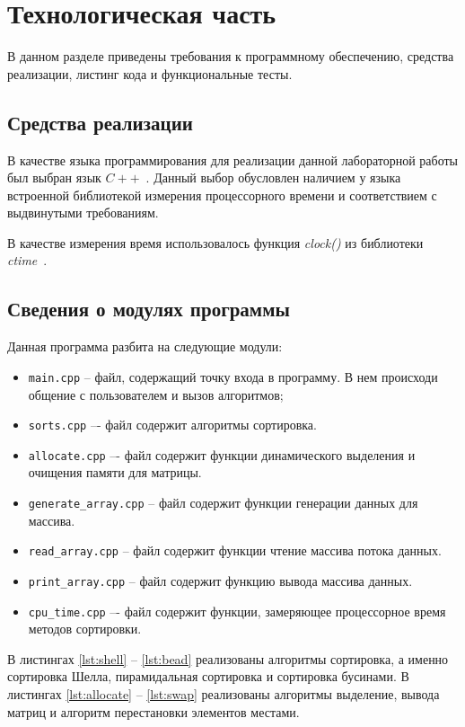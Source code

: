 \chapter{Технологическая часть}

В данном разделе приведены требования к программному обеспечению, средства реализации, листинг кода и функциональные тесты.

\section{Средства реализации}

В качестве языка программирования для реализации данной лабораторной работы был выбран язык $C++$~\cite{cpp-lang}. Данный выбор обусловлен наличием у языка
встроенной библиотекой измерения процессорного времени и соответствием с выдвинутыми требованиям.

В качестве измерения время использовалось функция \textit{clock()} из библиотеки \textit{ctime}~\cite{cpp-lang-time}. 

\clearpage

\section{Сведения о модулях программы}

Данная программа разбита на следующие модули:

\begin{itemize}[label=---]
	\item \texttt{main.cpp} -- файл, содержащий точку входа в программу. В нем происходи	общение с пользователем и вызов алгоритмов;
	\item \texttt{sorts.cpp} –- файл содержит алгоритмы сортировка.
	\item \texttt{allocate.cpp} –- файл содержит функции динамического выделения и очищения памяти для матрицы.
	\item \texttt{generate\_array.cpp} -- файл содержит функции генерации данных для массива.
	\item \texttt{read\_array.cpp} -- файл содержит функции чтение массива потока данных.
	\item \texttt{print\_array.cpp} -- файл содержит функцию вывода массива данных.
	\item \texttt{cpu\_time.cpp} –- файл содержит функции, замеряющее процессорное время методов сортировки.
\end{itemize}

В листингах \ref{lst:shell} -- \ref{lst:bead} реализованы алгоритмы сортировка, а именно сортировка Шелла, пирамидальная сортировка и сортировка бусинами.
В листингах \ref{lst:allocate} -- \ref{lst:swap} реализованы алгоритмы выделение, вывода матриц и алгоритм перестановки элементов местами.

